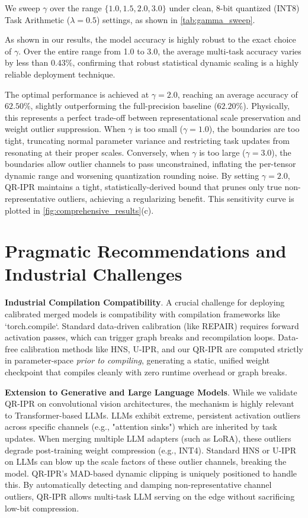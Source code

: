 \documentclass{article}
\theoremstyle{plain}
\theoremstyle{definition}
\theoremstyle{remark}
\begin{document}
We sweep $\gamma$ over the range $\{1.0, 1.5, 2.0, 3.0\}$ under clean, 8-bit quantized (INT8) Task Arithmetic ($\lambda=0.5$) settings, as shown in \cref{tab:gamma_sweep}.

As shown in our results, the model accuracy is highly robust to the exact choice of $\gamma$. Over the entire range from 1.0 to 3.0, the average multi-task accuracy varies by less than $0.43\%$, confirming that robust statistical dynamic scaling is a highly reliable deployment technique.

The optimal performance is achieved at $\gamma = 2.0$, reaching an average accuracy of $62.50\%$, slightly outperforming the full-precision baseline ($62.20\%$). Physically, this represents a perfect trade-off between representational scale preservation and weight outlier suppression. When $\gamma$ is too small ($\gamma = 1.0$), the boundaries are too tight, truncating normal parameter variance and restricting task updates from resonating at their proper scales. Conversely, when $\gamma$ is too large ($\gamma = 3.0$), the boundaries allow outlier channels to pass unconstrained, inflating the per-tensor dynamic range and worsening quantization rounding noise. By setting $\gamma = 2.0$, QR-IPR maintains a tight, statistically-derived bound that prunes only true non-representative outliers, achieving a regularizing benefit. This sensitivity curve is plotted in \cref{fig:comprehensive_results}(c).

\vspace{-2.0mm}
\section{Pragmatic Recommendations and Industrial Challenges}
\label{sec:recommendations}
\vspace{-2.5mm}

\textbf{Industrial Compilation Compatibility}.  A crucial challenge for deploying calibrated merged models is compatibility with compilation frameworks like `torch.compile`. Standard data-driven calibration (like REPAIR) requires forward activation passes, which can trigger graph breaks and recompilation loops. Data-free calibration methods like HNS, U-IPR, and our QR-IPR are computed strictly in parameter-space \emph{prior to compiling}, generating a static, unified weight checkpoint that compiles cleanly with zero runtime overhead or graph breaks.

\textbf{Extension to Generative and Large Language Models}.  While we validate QR-IPR on convolutional vision architectures, the mechanism is highly relevant to Transformer-based LLMs. LLMs exhibit extreme, persistent activation outliers across specific channels (e.g., "attention sinks") which are inherited by task updates. When merging multiple LLM adapters (such as LoRA), these outliers degrade post-training weight compression (e.g., INT4). Standard HNS or U-IPR on LLMs can blow up the scale factors of these outlier channels, breaking the model. QR-IPR's MAD-based dynamic clipping is uniquely positioned to handle this. By automatically detecting and damping non-representative channel outliers, QR-IPR allows multi-task LLM serving on the edge without sacrificing low-bit compression.
\end{document}
